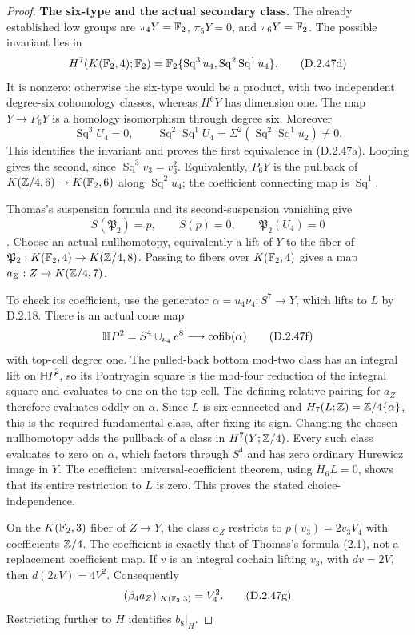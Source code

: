 \begin{proof}
\textbf{The six-type and the actual secondary class.}
The already established low groups are
$\pi_4Y=\mathbb F_2$, $\pi_5Y=0$, and $\pi_6Y=\mathbb F_2$.
The possible invariant lies in
\[
 H^7(K(\mathbb F_2,4);\mathbb F_2)
 =\mathbb F_2\{\operatorname{Sq}^3u_4,
                    \operatorname{Sq}^2\operatorname{Sq}^1u_4\}.
 \tag{D.2.47d}
\]
It is nonzero: otherwise the six-type would be a product,
with two independent degree-six cohomology classes, whereas
$H^6Y$ has dimension one. The map $Y\to P_6Y$ is a homology
isomorphism through degree six. Moreover
\[
 \operatorname{Sq}^3U_4=0,
 \qquad
 \operatorname{Sq}^2\operatorname{Sq}^1U_4
      =\Sigma^2(\operatorname{Sq}^2\operatorname{Sq}^1u_2)\ne0.
\]
This identifies the invariant and proves the first equivalence
in \textup{(D.2.47a)}. Looping gives the second, since
$\operatorname{Sq}^3v_3=v_3^2$.
Equivalently, $P_6Y$ is the pullback of
$K(\mathbb Z/4,6)\to K(\mathbb F_2,6)$ along $\operatorname{Sq}^2u_4$;
the coefficient connecting map is $\operatorname{Sq}^1$.

Thomas's suspension formula and its second-suspension vanishing give
\[
 S(\mathfrak P_2)=p,\qquad S(p)=0,
 \qquad\mathfrak P_2(U_4)=0
 \tag{D.2.47e}
\]
\cite[Theorem~I, pp.~897--898, and Proposition~6.9,
p.~908]{Thomas1959Pontrjagin}.
Choose an actual nullhomotopy, equivalently a lift of $Y$ to
the fiber of $\mathfrak P_2:K(\mathbb F_2,4)\to K(\mathbb Z/4,8)$.
Passing to fibers over $K(\mathbb F_2,4)$ gives a map
$a_Z:Z\to K(\mathbb Z/4,7)$.

To check its coefficient, use the generator
$\alpha=u_4\nu_4:S^7\to Y$, which lifts to $L$ by D.2.18.
There is an actual cone map
\[
 \mathbb H P^2=S^4\cup_{\nu_4}e^8
              \longrightarrow \operatorname{cofib}(\alpha)
 \tag{D.2.47f}
\]
with top-cell degree one. The pulled-back bottom mod-two class
has an integral lift on $\mathbb H P^2$, so its Pontryagin
square is the mod-four reduction of the integral square and
evaluates to one on the top cell. The defining relative
pairing for $a_Z$ therefore evaluates oddly on $\alpha$.
Since $L$ is six-connected and $H_7(L;\mathbb Z)=\mathbb Z/4\{\alpha\}$,
this is the required fundamental class, after fixing its sign.
Changing the chosen nullhomotopy adds the pullback of a class
in $H^7(Y;\mathbb Z/4)$. Every such class evaluates to zero on
$\alpha$, which factors through $S^4$ and has zero ordinary
Hurewicz image in $Y$. The coefficient universal-coefficient
theorem, using $H_6L=0$, shows that its entire restriction
to $L$ is zero. This proves the stated choice-independence.

On the $K(\mathbb F_2,3)$ fiber of $Z\to Y$, the class $a_Z$
restricts to $p(v_3)=2v_3V_4$ with coefficients $\mathbb Z/4$.
The coefficient is exactly that of Thomas's formula (2.1),
not a replacement coefficient map. If $v$ is an integral
cochain lifting $v_3$, with $dv=2V$, then
$d(2vV)=4V^2$. Consequently
\[
                  (\beta_4a_Z)|_{K(\mathbb F_2,3)}=V_4^2.
                  \tag{D.2.47g}
\]
Restricting further to $H$ identifies $b_8|_H$.


\end{proof}
